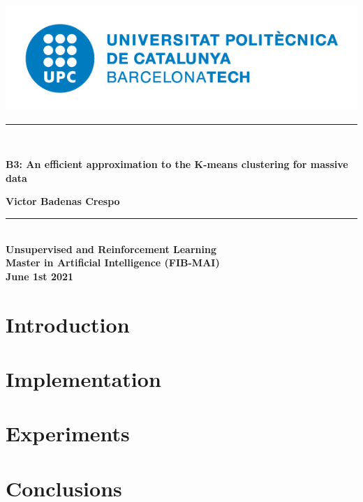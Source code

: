 \documentclass[oneside,11pt]{book}
\begin{document}
\titleformat{\chapter}[display]
{\normalfont\huge\bfseries}{\chaptertitlename\ \thechapter}{20pt}{\Huge}
\includegraphics[scale=.3]{upc-logo.png}
\begin{center}
\vspace*{2in}
\noindent\hfil\rule{17cm}{0.2mm}\hfil\\
\begin{Huge}
    \textbf{B3: An efficient approximation to the K-means clustering for massive data\\}
\end{Huge}
\vspace*{0.3in}
\begin{large}
    \textbf{Victor Badenas Crespo}
\end{large}
\noindent\hfil\rule{17cm}{0.2mm}\hfil\\
\vspace*{3in}
\textbf{Unsupervised and Reinforcement Learning\\}
\textbf{Master in Artificial Intelligence (FIB-MAI)\\}
\vspace*{0.2in}
\textbf{June 1st 2021}

\end{center}
\thispagestyle{empty}
\clearpage

\tableofcontents
{}
\clearpage
{}

\chapter{Introduction}


\chapter{Implementation}


\chapter{Experiments}


\chapter{Conclusions}


\printbibliography
\end{document}
